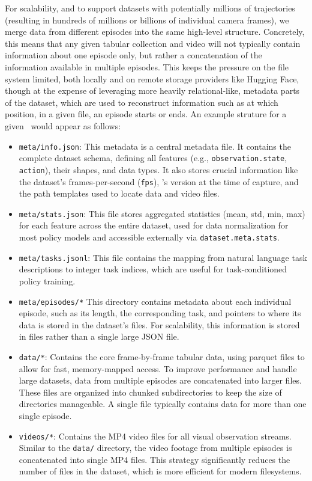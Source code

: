 For scalability, and to support datasets with potentially millions of trajectories (resulting in hundreds of millions or billions of individual camera frames), we merge data from different episodes into the same high-level structure.
Concretely, this means that any given tabular collection and video will not typically contain information about one episode only, but rather a concatenation of the information available in multiple episodes.
This keeps the pressure on the file system limited, both locally and on remote storage providers like Hugging Face, though at the expense of leveraging more heavily relational-like, metadata parts of the dataset, which are used to reconstruct information such as at which position, in a given file, an episode starts or ends.
An example struture for a given \lerobotdataset~would appear as follows:
\begin{itemize}
\item \texttt{meta/info.json}: This metadata is a central metadata file. It contains the complete dataset schema, defining all features (e.g., \texttt{observation.state}, \texttt{action}), their shapes, and data types. It also stores crucial information like the dataset's frames-per-second (\texttt{fps}), \lerobot's version at the time of capture, and the path templates used to locate data and video files.
\item \texttt{meta/stats.json}: This file stores aggregated statistics (mean, std, min, max) for each feature across the entire dataset, used for data normalization for most policy models and accessible externally via \texttt{dataset.meta.stats}.
\item \texttt{meta/tasks.jsonl}: This file contains the mapping from natural language task descriptions to integer task indices, which are useful for task-conditioned policy training.
\item \texttt{meta/episodes/*} This directory contains metadata about each individual episode, such as its length, the corresponding task, and pointers to where its data is stored in the dataset's files. For scalability, this information is stored in files rather than a single large JSON file.
\item \texttt{data/*}: Contains the core frame-by-frame tabular data, using parquet files to allow for fast, memory-mapped access. To improve performance and handle large datasets, data from multiple episodes are concatenated into larger files. These files are organized into chunked subdirectories to keep the size of directories manageable. A single file typically contains data for more than one single episode.
\item \texttt{videos/*}: Contains the MP4 video files for all visual observation streams. Similar to the \texttt{data/} directory, the video footage from multiple episodes is concatenated into single MP4 files. This strategy significantly reduces the number of files in the dataset, which is more efficient for modern filesystems.
\end{itemize}

